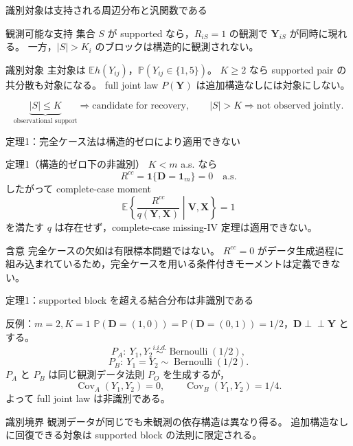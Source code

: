 \documentclass[aspectratio=169,10pt]{beamer}
\newcommand{\E}{\mathbb{E}}
\newcommand{\Prb}{\mathbb{P}}
\newcommand{\1}{\mathbf{1}}
\newcommand{\indep}{\mathrel{\perp\!\!\!\perp}}
\newcommand{\Y}{\bm{Y}}
\newcommand{\V}{\bm{V}}
\newcommand{\X}{\bm{X}}
\newcommand{\D}{\bm{D}}
\newcommand{\Cov}{\operatorname{Cov}}
\begin{document}
\begin{frame}{識別対象は支持される周辺分布と汎関数である}
\begin{block}{観測可能な支持}
集合 $S$ が supported なら，$R_{iS}=1$ の観測で $\Y_{iS}$ が同時に現れる。
一方，$|S|>K_i$ のブロックは構造的に観測されない。
\end{block}
\begin{alertblock}{識別対象}
主対象は $\E h(Y_{ij})$，$\Prb(Y_{ij}\in\{1,5\})$。
$K\ge2$ なら supported pair の共分散も対象になる。
full joint law $P(\Y)$ は追加構造なしには対象にしない。
\end{alertblock}
\[
\underbrace{|S|\le K}_{\text{observational support}}
\Rightarrow\text{candidate for recovery},
\qquad
|S|>K\Rightarrow\text{not observed jointly}.
\]
\end{frame}

\begin{frame}{定理1：完全ケース法は構造的ゼロにより適用できない}
\begin{block}{定理1（構造的ゼロ下の非識別）}
$K<m$ a.s. なら
\[
R^{cc}=\1\{\D=\bm1_m\}=0\quad\text{a.s.}
\]
したがって complete-case moment
\[
\E\left\{\frac{R^{cc}}{q(\Y,\X)}\middle|\V,\X\right\}=1
\]
を満たす $q$ は存在せず，complete-case missing-IV 定理は適用できない。
\end{block}
\begin{alertblock}{含意}
完全ケースの欠如は有限標本問題ではない。
$R^{cc}=0$ がデータ生成過程に組み込まれているため，完全ケースを用いる条件付きモーメントは定義できない。
\end{alertblock}
\end{frame}

\begin{frame}{定理1：supported block を超える結合分布は非識別である}
\begin{alertblock}{反例：$m=2,K=1$}
$\Prb(\D=(1,0))=\Prb(\D=(0,1))=1/2$，$\D\indep\Y$ とする。
\[
P_A:\ Y_1,Y_2\stackrel{i.i.d.}{\sim}\operatorname{Bernoulli}(1/2),
\]
\[
P_B:\ Y_1=Y_2\sim\operatorname{Bernoulli}(1/2).
\]
$P_A$ と $P_B$ は同じ観測データ法則 $P_O$ を生成するが，
\[
\Cov_A(Y_1,Y_2)=0,
\qquad
\Cov_B(Y_1,Y_2)=1/4.
\]
よって full joint law は非識別である。
\end{alertblock}
\begin{block}{識別境界}
観測データが同じでも未観測の依存構造は異なり得る。
追加構造なしに回復できる対象は supported block の法則に限定される。
\end{block}
\end{frame}
\end{document}
